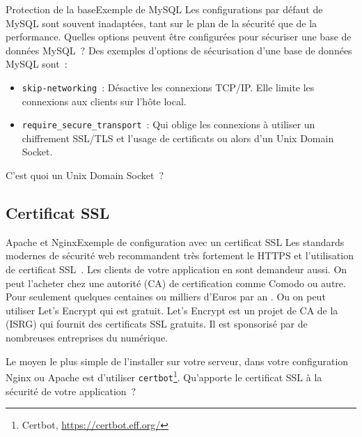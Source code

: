 \documentclass{beamer}
\begin{document}
    \begin{frame}{Protection de la base}{Exemple de MySQL}
        Les configurations par défaut de MySQL sont souvent inadaptées, tant sur le plan de la sécurité que de la performance.
        \bigbreak
        Quelles options peuvent être configurées pour sécuriser une base de données MySQL~?
        \pause
        \bigbreak
        Des exemples d'options de sécurisation d'une base de données MySQL sont~:
        \begin{itemize}
            \item \lstinline{skip-networking}~: Désactive les connexions TCP/IP.
            Elle limite les connexions aux clients sur l'hôte local.
            \item \lstinline{require_secure_transport}~: Qui oblige les connexions à utiliser un chiffrement SSL/TLS et l'usage de certificats ou alors d'un Unix Domain Socket.
        \end{itemize}
        C'est quoi un Unix Domain Socket~?
    \end{frame}

    \subsection{Certificat SSL}\label{subsec:certificat-ssl}
    \begin{frame}{Apache et Nginx}{Exemple de configuration avec un certificat SSL}
        Les standards modernes de sécurité web recommandent très fortement le HTTPS et l'utilisation de certificat SSL~.
        Les clients de votre application en sont demandeur aussi.
        \bigbreak
        On peut l'acheter chez une autorité (CA) de certification comme Comodo ou autre.
        Pour seulement quelques centaines ou milliers d'Euros par an .
        Ou on peut utiliser Let's Encrypt qui est gratuit.
        \bigbreak
        Let's Encrypt est un projet de CA de la  (ISRG) qui fournit des certificats SSL gratuits.
        Il est sponsorisé par de nombreuses entreprises du numérique.

        Le moyen le plus simple de l'installer sur votre serveur, dans votre configuration Nginx ou Apache est d'utiliser \lstinline{certbot}\footnote{Certbot, \url{https://certbot.eff.org/}}.
        \bigbreak
        Qu'apporte le certificat SSL à la sécurité de votre application~?
    \end{frame}
\end{document}
